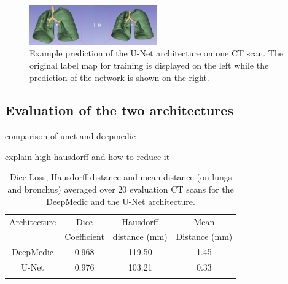 \begin{figure}[h!]
	\includegraphics[width=0.49\textwidth, angle=0]{files/predunet.png}
	\caption{Example prediction of the U-Net architecture on one CT scan. The original label map for training is displayed on the left while the prediction of the network is shown on the right.}
	\label{pred_unet}
\end{figure}


\subsection{Evaluation of the two architectures}


comparison of unet and deepmedic

explain high hausdorff and how to reduce it


\begin{table}[h!]
	\caption{Dice Loss, Hausdorff distance and mean distance (on lungs and bronchus) averaged over 20 evaluation CT scans for the DeepMedic and the U-Net architecture.}
	\label{table_result}
	\centering
	\setlength{\tabcolsep}{10pt}
	\renewcommand{\arraystretch}{1.5}
	\begin{tabular}{c c c c}
		\hline 
		Architecture & Dice & Hausdorff & Mean \\
		& Coefficient & distance (mm) & Distance (mm) \\ 
		\hline 
		DeepMedic & 0.968 & 119.50 & 1.45 \\ 
		U-Net & 0.976 & 103.21 & 0.33 \\ 
		\hline
		\newline 
	\end{tabular}

\end{table}
